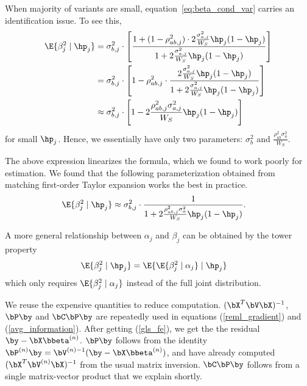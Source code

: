 
When majority of variants are small, equation~\ref{eq:beta_cond_var} carries an identification issue.
To see this,
\begin{align}
    \begin{aligned}
    \E{\beta_j^2 \mid \hp_j} &= 
         \sigma_{b,j}^2 \cdot 
    \left[
        \frac{
            1 + (1-\rho_{ab,j}^2) \cdot 2\frac{\sigma_{a,j}^2}{W_S} \hp_j(1-\hp_j)}{
            1 + 2\frac{\sigma_{a,j}^2}{W_S} \hp_j(1-\hp_j) 
        }
    \right]  \\
    &= \sigma_{b,j}^2 \cdot 
    \left[
    1 - 
    \rho_{ab,j}^2 \cdot 
        \frac{
             2\frac{\sigma_{a,j}^2}{W_S} \hp_j(1-\hp_j)}{
            1 + 2\frac{\sigma_{a,j}^2}{W_S} \hp_j(1-\hp_j) 
        }
    \right] \\
    &\approx \sigma_{b,j}^2 \cdot 
    \left[
    1 - 
             2\frac{\rho_{ab,j}^2\sigma_{a,j}^2}{W_S} \hp_j(1-\hp_j)
    \right]
    \end{aligned}
\end{align}
for small $\hp_j$.
Hence, we essentially have only two parameters: $\sigma_{b}^2$ and $\frac{\rho^2_{ab}\sigma_a^2}{W_S}$.

The above expression linearizes the formula, which we found to work poorly for estimation.
We found that the following parameterization obtained from matching first-order Taylor expansion works the best in practice.
\begin{align}
    \begin{aligned}
     \E{\beta_j^2 \mid \hp_j} &\approx
     \sigma_{b,j}^2 \cdot
     \frac{1}{1
     +2 \frac{\rho_{ab,j}^2\sigma_a^2}{W_S}\hp_j(1-\hp_j)}.
    \end{aligned} 
\end{align}

A more general relationship between $\alpha_j$ and $\beta_j$ can be obtained by the tower property
\begin{align}
    \begin{aligned}
        \E{\beta_j^2 \mid \hp_j}
        &= \E{\E{\beta_j^2 \mid \alpha_j} \mid \hp_j}
    \end{aligned}
\end{align}
which only requires $\E{\beta_j^2 \mid \alpha_j}$ instead of the full joint distribution.


We reuse the expensive quantities to reduce computation.
$(\bX^T \bV \bX)^{-1}$, $\bP\by$ and $\bC\bP\by$ are repeatedly used in equations (\ref{reml_gradient}) and (\ref{avg_information}).
After getting (\ref{gls_fe}), we get the the residual $\by - \bX\bbeta^{(n)}$.
$\bP\by$ follows from the identity $\bP^{(n)}\by = \bV^{(n)-1} (\by - \bX \bbeta^{(n)})$,
and have already computed $(\bX^T \bV^{(n)} \bX)^{-1}$ from the usual matrix inversion.
$\bC \bP \by$ follows from a single matrix-vector product that we explain shortly.

